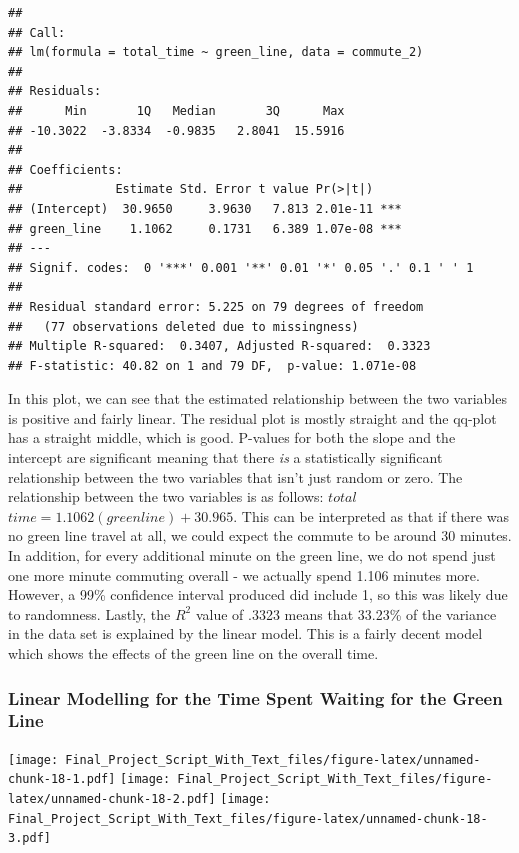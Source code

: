\documentclass[
]{article}
\begin{document}
\begin{verbatim}
## 
## Call:
## lm(formula = total_time ~ green_line, data = commute_2)
## 
## Residuals:
##      Min       1Q   Median       3Q      Max 
## -10.3022  -3.8334  -0.9835   2.8041  15.5916 
## 
## Coefficients:
##             Estimate Std. Error t value Pr(>|t|)    
## (Intercept)  30.9650     3.9630   7.813 2.01e-11 ***
## green_line    1.1062     0.1731   6.389 1.07e-08 ***
## ---
## Signif. codes:  0 '***' 0.001 '**' 0.01 '*' 0.05 '.' 0.1 ' ' 1
## 
## Residual standard error: 5.225 on 79 degrees of freedom
##   (77 observations deleted due to missingness)
## Multiple R-squared:  0.3407, Adjusted R-squared:  0.3323 
## F-statistic: 40.82 on 1 and 79 DF,  p-value: 1.071e-08
\end{verbatim}

In this plot, we can see that the estimated relationship between the two
variables is positive and fairly linear. The residual plot is mostly
straight and the qq-plot has a straight middle, which is good. P-values
for both the slope and the intercept are significant meaning that there
\emph{is} a statistically significant relationship between the two
variables that isn't just random or zero. The relationship between the
two variables is as follows:
\(total\)\(time = 1.1062(greenline) + 30.965\). This can be interpreted
as that if there was no green line travel at all, we could expect the
commute to be around 30 minutes. In addition, for every additional
minute on the green line, we do not spend just one more minute commuting
overall - we actually spend 1.106 minutes more. However, a 99\%
confidence interval produced did include 1, so this was likely due to
randomness. Lastly, the \(R^2\) value of .3323 means that 33.23\% of the
variance in the data set is explained by the linear model. This is a
fairly decent model which shows the effects of the green line on the
overall time.

\hypertarget{linear-modelling-for-the-time-spent-waiting-for-the-green-line}{%
\subsubsection{Linear Modelling for the Time Spent Waiting for the Green
Line}\label{linear-modelling-for-the-time-spent-waiting-for-the-green-line}}

\texttt{[image: Final\_Project\_Script\_With\_Text\_files/figure-latex/unnamed-chunk-18-1.pdf]}
\texttt{[image: Final\_Project\_Script\_With\_Text\_files/figure-latex/unnamed-chunk-18-2.pdf]}
\texttt{[image: Final\_Project\_Script\_With\_Text\_files/figure-latex/unnamed-chunk-18-3.pdf]}
\end{document}
